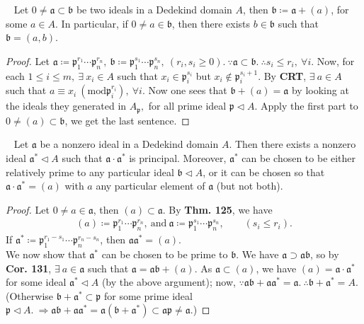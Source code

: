 \documentclass[12pt,a4paper,footinclude=true,headinclude=true]{scrbook} %
\newenvironment{corollary}[2][]
{\renewcommand\theinnercustomcol{#2}\innercustomcol[#1]
\begin{mdframed}[backgroundcolor=gray!20]\ }
{\end{mdframed}\endinnercustomcol}
\begin{document}
\begin{corollary}{131}
    Let $0\neq\mathfrak{a}\subset\mathfrak{b}$ be two ideals in a Dedekind domain $A$, then $\mathfrak{b}\coloneqq\mathfrak{a}+(a)$, for some $a\in A$. In particular, if $0\neq a\in\mathfrak{b}$, then there exists $b\in\mathfrak{b}$ such that $\mathfrak{b}= (a,b)$.
\end{corollary}
\begin{proof}
    Let $\mathfrak{a}\coloneqq\mathfrak{p}_1^{r_1}\cdots\mathfrak{p}_n^{r_n},\ \mathfrak{b}\coloneqq\mathfrak{p}_1^{s_1} \cdots\mathfrak{p}_n^{s_n},\ (r_i,s_i\geq0).\ \because\mathfrak{a} \subset\mathfrak{b}.\ \therefore s_i\leq r_i,\ \forall i$. Now, for each $1\leq i\leq m,\ \exists\ x_i\in A$ such that $x_i\in \mathfrak{p}_i^{s_i}$ but $x_i\notin\mathfrak{p}_i^{s_i+1}$. By \textbf{CRT}, $\exists\ a\in A$ such that $a\equiv x_i\ (\mathrm{mod}\mathfrak{p}_i^{r_i}),\ \forall i$. Now one sees that $\mathfrak{b}+(a)=\mathfrak{a}$ by looking at the ideals they generated in $A_{\mathfrak{p}},$ for all prime ideal $\mathfrak{p}\triangleleft A$. Apply the first part to $0\neq(a)\subset\mathfrak{b}$, we get the last sentence.
\end{proof}

\begin{corollary}{132}
    Let $\mathfrak{a}$ be a nonzero ideal in a Dedekind domain $A$. Then there exists a nonzero ideal $\mathfrak{a}^\ast\triangleleft A$ such that $\mathfrak{a}\cdot \mathfrak{a}^\ast$ is principal. Moreover, $\mathfrak{a}^\ast$ can be chosen to be either relatively prime to any particular ideal $\mathfrak{b}\triangleleft A$, or it can be chosen so that $\mathfrak{a}\cdot\mathfrak{a}^\ast=(a)$ with $a$ any particular element of $\mathfrak{a}$ (but not both).
\end{corollary}
\begin{proof}
    Let $0\neq a\in\mathfrak{a}$, then $(a)\subset\mathfrak{a}$. By \textbf{Thm. 125}, we have 
    \begin{align*}
        (a)\coloneqq\mathfrak{p}_1^{r_1}\cdots\mathfrak{p}_n^{r_n},\ \text{and}\ \mathfrak{a}\coloneqq\mathfrak{p}_1^{s_1} \cdots\mathfrak{p}_n^{s_n},\qquad (s_i\leq r_i).
    \end{align*}
    If $\mathfrak{a}^\ast\coloneqq\mathfrak{p}_1^{r_1-s_1}\cdots\mathfrak{p}_n^{r_n-s_n}$, then $\mathfrak{a}\mathfrak{a}^\ast=(a)$.\\
    We now show that $\mathfrak{a}^\ast$ can be chosen to be prime to $\mathfrak{b}$. We have $\mathfrak{a}\supset\mathfrak{a}\mathfrak{b}$, so by \textbf{Cor. 131}, $\exists\ a\in\mathfrak{a}$ such that $\mathfrak{a}=\mathfrak{a}\mathfrak{b}+(a)$. As $\mathfrak{a}\subset (a)$, we have $(a)=\mathfrak{a}\cdot\mathfrak{a}^\ast$ for some ideal $\mathfrak{a}^\ast\triangleleft A$ (by the above argument); now, $\because \mathfrak{a}\mathfrak{b}+\mathfrak{a}\mathfrak{a}^\ast =\mathfrak{a}.\ \therefore \mathfrak{b}+\mathfrak{a}^\ast=A$. (Otherwise $\mathfrak{b}+\mathfrak{a}^\ast\subset\mathfrak{p}$ for some prime ideal $\mathfrak{p}\triangleleft A.\ \Rightarrow \mathfrak{a}\mathfrak{b}+\mathfrak{a}\mathfrak{a}^\ast=\mathfrak{a} (\mathfrak{b}+\mathfrak{a}^\ast)\subset\mathfrak{a}\mathfrak{p}\neq \mathfrak{a}$.)
\end{proof}
\end{document}
